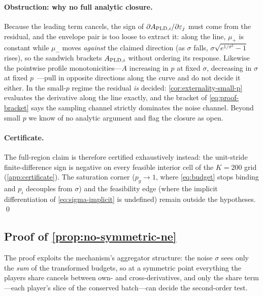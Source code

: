 \paragraph{Obstruction: why no full analytic closure.} Because the
leading term cancels, the sign of $\partial A_{\mathrm{PLD},i} / \partial \varepsilon_j$
must come from the residual, and the envelope pair is too loose to
extract it: along the line, $\mu_+$ is constant while $\mu_-$ moves
\emph{against} the claimed direction (as $\sigma$ falls,
$\sigma\sqrt{e^{1/\sigma^2}-1}$ rises), so the sandwich brackets
$A_{\mathrm{PLD},i}$ without ordering its response. Likewise the pointwise profile
monotonicities---$A$ increasing in $p$ at fixed $\sigma$, decreasing
in $\sigma$ at fixed $p$~\cite{balle2020privacy}---pull in opposite
directions along the curve and do not decide it either. In the
small-$p$ regime the residual \emph{is} decided:
\cref{cor:externality-small-p} evaluates the derivative along the
line exactly, and the bracket of \eqref{eq:proof-bracket} says the
sampling channel strictly dominates the noise channel. Beyond small
$p$ we know of no analytic argument and flag the closure as open.

\paragraph{Certificate.} The full-region claim is therefore certified
exhaustively instead: the unit-stride finite-difference sign is
negative on every feasible interior cell of the $K{=}200$ grid
(\cref{app:certificate}). The saturation corner ($p_g \to 1$, where
\eqref{eq:budget} stops binding and $p_i$ decouples from $\sigma$) and the
feasibility edge (where the implicit differentiation of
\eqref{eq:sigma-implicit} is undefined) remain outside the
hypotheses.
\qed

\subsection{Proof of \texorpdfstring{\cref{prop:no-symmetric-ne}}{the no-symmetric-NE proposition}}
\label{app:proof-no-symmetric}

The proof exploits the mechanism's aggregator structure: the noise
$\sigma$ sees only the \emph{sum} of the transformed budgets, so at a
symmetric point everything the players share cancels between own- and
cross-derivatives, and only the share term---each player's slice of
the conserved batch---can decide the second-order test.


